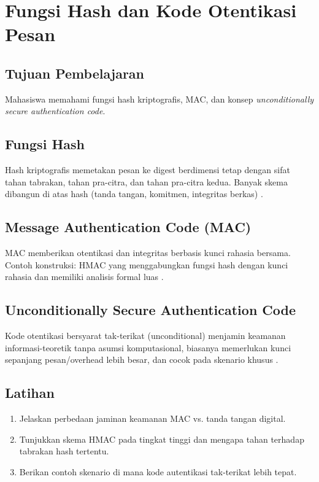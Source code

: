 \documentclass[../main.tex]{subfiles}
\begin{document}
\chapter{Fungsi Hash dan Kode Otentikasi Pesan}

\section{Tujuan Pembelajaran}
Mahasiswa memahami fungsi hash kriptografis, MAC, dan konsep \emph{unconditionally secure authentication code}.

\section{Fungsi Hash}
Hash kriptografis memetakan pesan ke digest berdimensi tetap dengan sifat tahan tabrakan, tahan pra-citra, dan tahan pra-citra kedua. Banyak skema dibangun di atas hash (tanda tangan, komitmen, integritas berkas) \citep{menezes}.

\section{Message Authentication Code (MAC)}
MAC memberikan otentikasi dan integritas berbasis kunci rahasia bersama. Contoh konstruksi: HMAC yang menggabungkan fungsi hash dengan kunci rahasia dan memiliki analisis formal luas \citep{katzlindell}.

\section{Unconditionally Secure Authentication Code}
Kode otentikasi bersyarat tak-terikat (unconditional) menjamin keamanan informasi-teoretik tanpa asumsi komputasional, biasanya memerlukan kunci sepanjang pesan/overhead lebih besar, dan cocok pada skenario khusus \citep{menezes}.

\section{Latihan}
\begin{enumerate}
  \item Jelaskan perbedaan jaminan keamanan MAC vs. tanda tangan digital.
  \item Tunjukkan skema HMAC pada tingkat tinggi dan mengapa tahan terhadap tabrakan hash tertentu.
  \item Berikan contoh skenario di mana kode autentikasi tak-terikat lebih tepat.
\end{enumerate}
\end{document}
